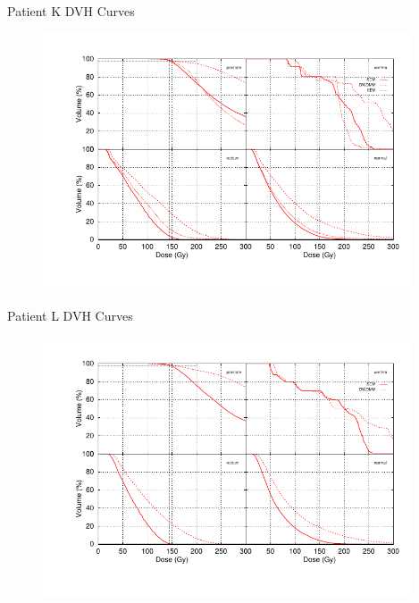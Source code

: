\documentclass{beamer}
\begin{document}
\begin{frame}{Patient K DVH Curves}
  
  \begin{figure}[h!]
    \begin{center}
      \includegraphics[width=4.3in]{figures/saupe_us-all4x4.pdf}
    \end{center}
  \end{figure}

\end{frame}

\begin{frame}{Patient L DVH Curves}
  
  \begin{figure}[h!]
    \begin{center}
      \includegraphics[width=4.3in]{figures/smieja-all4x4.pdf}
    \end{center}
  \end{figure}

\end{frame}
\end{document}
